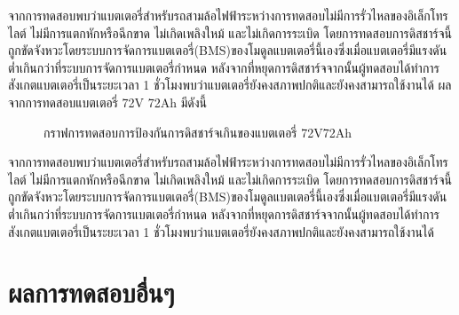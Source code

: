 \hspace*{2cm}
จากการทดสอบพบว่าแบตเตอรี่สำหรับรถสามล้อไฟฟ้าระหว่างการทดสอบไม่มีการรั่วไหลของอิเล็กโทรไลต์ ไม่มีการแตกหักหรือฉีกขาด ไม่เกิดเพลิงใหม้ และไม่เกิดการระเบิด
โดยการทดสอบการดิสชาร์จนี้ถูกขัดจังหวะโดยระบบการจัดการแบตเตอรี่(BMS)ของโมดูลแบตเตอรี่นี้เองซึ่งเมื่อแบตเตอรี่มีแรงดันต่ำเกินกว่าที่ระบบการจัดการแบตเตอรี่กำหนด
หลังจากที่หยุดการดิสชาร์จจากนั้นผู้ทดสอบได้ทำการสังเกตแบตเตอรี่เป็นระยะเวลา 1 ชั่วโมงพบว่าแบตเตอรี่ยังคงสภาพปกติและยังคงสามารถใช้งานได้
\newline
\pagebreak
ผลจากการทดสอบแบตเตอรี่ 72V 72Ah มีดังนี้
\begin{center}
	\begin{figure}[H]
		\centering
		\captionsetup{justification=centering,margin=2cm}
		\caption{กราฟการทดสอบการป้องกันการดิสชาร์จเกินของแบตเตอรี่ 72V72Ah}
	\end{figure}
\end{center}
\hspace*{2cm}
จากการทดสอบพบว่าแบตเตอรี่สำหรับรถสามล้อไฟฟ้าระหว่างการทดสอบไม่มีการรั่วไหลของอิเล็กโทรไลต์ ไม่มีการแตกหักหรือฉีกขาด ไม่เกิดเพลิงใหม้ และไม่เกิดการระเบิด
โดยการทดสอบการดิสชาร์จนี้ถูกขัดจังหวะโดยระบบการจัดการแบตเตอรี่(BMS)ของโมดูลแบตเตอรี่นี้เองซึ่งเมื่อแบตเตอรี่มีแรงดันต่ำเกินกว่าที่ระบบการจัดการแบตเตอรี่กำหนด
หลังจากที่หยุดการดิสชาร์จจากนั้นผู้ทดสอบได้ทำการสังเกตแบตเตอรี่เป็นระยะเวลา 1 ชั่วโมงพบว่าแบตเตอรี่ยังคงสภาพปกติและยังคงสามารถใช้งานได้
\section{ผลการทดสอบอื่นๆ}
